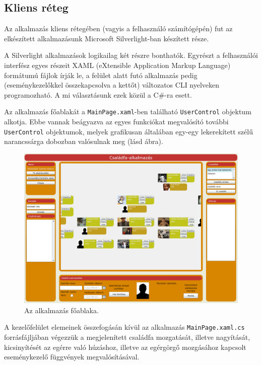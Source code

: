 \subsection{Kliens réteg}\label{sect:kliens_reteg}

Az alkalmazás kliens rétegében (vagyis a felhasználó számítógépén) fut az elkészített alkalmazásunk Microsoft Silverlight-ban készített része.

A Silverlight alkalmazások logikailag két részre bonthatók. Egyrészt a felhasználói interfész egyes részeit XAML (eXtensible Application Markup Language) formátumú fájlok írják le, a felület alatt futó alkalmazás pedig (eseménykezelőkkel összekapcsolva a kettőt) változatos CLI nyelveken programozható. A mi választásunk ezek közül a C\#-ra esett.

\bigskip

Az alkalmazás főablakát a \texttt{MainPage.xaml}-ben található \texttt{UserControl} objektum alkotja. Ebbe vannak beágyazva az egyes funkciókat megvalósító további \texttt{UserControl} objektumok, melyek grafikusan általában egy-egy lekerekített szélű narancssárga dobozban valósulnak meg (lásd  ábra).

\begin{figure}[!ht]
\centering
\includegraphics[width=130mm, keepaspectratio]{figures/felulet.png}
\caption{Az alkalmazás főablaka.}
\label{fig:alk_felulet}
\end{figure}

A kezelőfelület elemeinek összefogásán kívül az alkalmazás \texttt{MainPage.xaml.cs} forrásfájljában végezzük a megjelenített családfa mozgatását, illetve nagyítását, kicsinyítését az egérre való húzáshoz, illetve az egérgörgő mozgásához kapcsolt eseménykezelő függvények megvalósításával.

